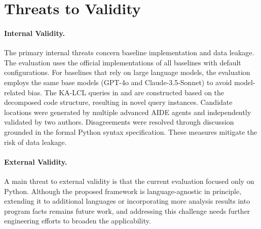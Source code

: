 \section{Threats to Validity}\label{sec:threats-dataloc}

\paragraph{Internal Validity.} 
The primary internal threats concern baseline implementation and data leakage. The evaluation uses the official implementations of all baselines with default configurations. For baselines that rely on large language models, the evaluation employs the same base models (GPT-4o and Claude-3.5-Sonnet) to avoid model-related bias. The KA-LCL queries in \dataset and \negset are constructed based on the decomposed code structure, resulting in novel query instances. Candidate locations were generated by multiple advanced AIDE agents and independently validated by two authors. Disagreements were resolved through discussion grounded in the formal Python syntax specification. These measures mitigate the risk of data leakage.

\paragraph{External Validity.} 
A main threat to external validity is that the current evaluation focused only on Python. Although the proposed framework is language-agnostic in principle, extending it to additional languages or incorporating more analysis results into program facts remains future work, and addressing this challenge needs further engineering efforts to broaden the applicability.
